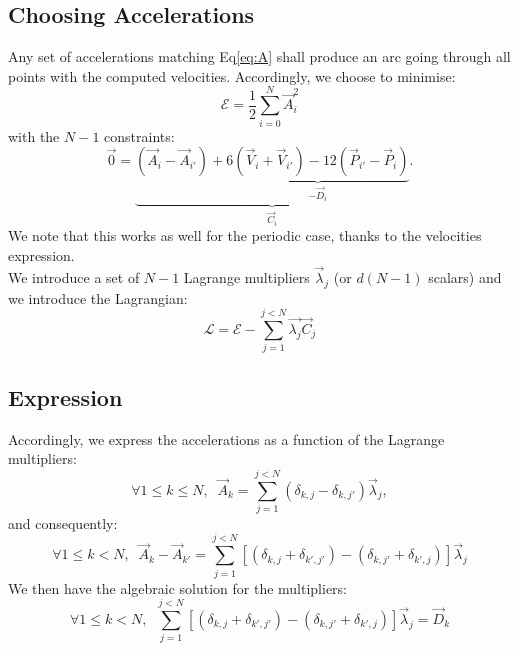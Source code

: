 \documentclass[aps,12pt]{revtex4}
\begin{document}
\subsection{Choosing Accelerations}
Any set of accelerations matching Eq\eqref{eq:A} shall produce an arc going through all points with the computed velocities.
Accordingly, we choose to minimise:
\begin{equation}
	\mathcal{E} = \frac{1}{2} \sum_{i=0}^N \vec{A}_i^2
\end{equation}
with the $N-1$ constraints:
\begin{equation}
	\vec{0} = \underbrace{\left(\vec{A}_i  - \vec{A}_{i'} \right) + \underbrace{6 \left(\vec{V}_{i} + \vec{V}_{i'}\right) - 12 \left(\vec{P}_{i'} - \vec{P}_{i}\right)}_{-\vec{D}_i}}_{\vec{C}_i}.
\end{equation}
We note that this works as well for the periodic case, thanks to the velocities expression.\\
We introduce a set of $N-1$ Lagrange multipliers $\vec{\lambda}_j$ (or $d(N-1)$ scalars) and we introduce the Lagrangian:
\begin{equation}
	\mathcal{L} = \mathcal{E} - \sum_{j=1}^{j<N} \vec{\lambda_j} \vec{C}_j	
\end{equation}
\subsection{Expression}
Accordingly, we express the accelerations as a function of the Lagrange multipliers:
\begin{equation}
	\forall 1\leq k \leq N, \;\; \vec{A}_k = \sum_{j=1}^{j<N} \left( \delta_{k,j} - \delta_{k,j'}\right) \vec{\lambda}_j,
\end{equation}
and consequently:
\begin{equation}
	\forall 1\leq k < N, \;\; \vec{A}_k - \vec{A}_{k'}
	= \sum_{j=1}^{j<N} \left[ 
	\left(\delta_{k,j}+\delta_{k',j'} \right) 
	- \left(\delta_{k,j'}+\delta_{k',j}\right)
	\right] \vec{\lambda}_j
\end{equation}
We then have the algebraic solution for the multipliers:
\begin{equation}
	\forall 1\leq k < N,\;\;\sum_{j=1}^{j<N} \left[ 
	\left(\delta_{k,j}+\delta_{k',j'} \right) 
	- \left(\delta_{k,j'}+\delta_{k',j}\right)
	\right] \vec{\lambda}_j = \vec{D}_k
\end{equation}
\end{document}
